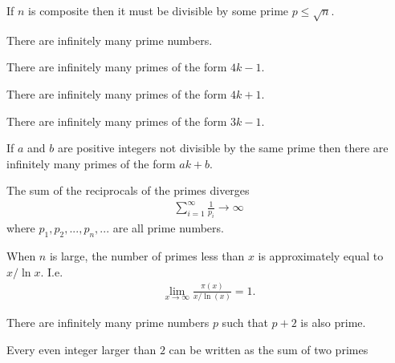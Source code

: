 \documentclass{article}
\begin{document}
\begin{theorem}[Boocher 2.5]
	If $n$ is composite then it must be divisible by some prime $p\leq\sqrt{n}$.
\end{theorem}

\begin{theorem}
	There are infinitely many prime numbers.
\end{theorem}

\begin{theorem}[Lecture 3]
	There are infinitely many primes of the form $4k-1$.
\end{theorem}

\begin{theorem}[Lecture 3]
	There are infinitely many primes of the form $4k+1$.
\end{theorem}

\begin{theorem}[Lecture 3]
	There are infinitely many primes of the form $3k-1$.
\end{theorem}

\begin{theorem}
	If $a$ and $b$ are positive integers not divisible by the same prime then there are
	infinitely many primes of the form $ak+b$.
\end{theorem}

\begin{theorem}[Boocher 2.8]
	The sum of the reciprocals of the primes diverges
	\begin{align*}
		\sum_{i=1}^\infty \frac{1}{p_i} \to \infty
	\end{align*}
	where $p_1,p_2,...,p_n,...$ are all prime numbers.
\end{theorem}

\begin{theorem}[Boocher 2.9]
	When $n$ is large, the number of primes less than $x$ is approximately equal to
	$x/\ln x$. I.e.
	\begin{align*}
		\lim_{x\to\infty} \frac{\pi(x)}{x/\ln(x)}=1.
	\end{align*}
\end{theorem}

\begin{conjecture}
	There are infinitely many prime numbers $p$ such that
	$p+2$ is also prime.
\end{conjecture}

\begin{conjecture}
	Every even integer larger than $2$ can be written as the
	sum of two primes
\end{conjecture}
\end{document}
